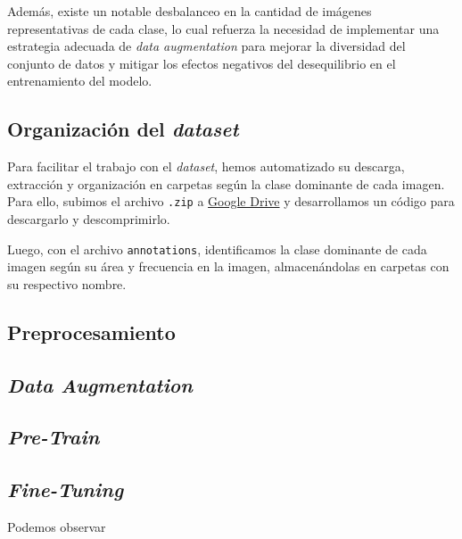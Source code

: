 \quad

\noindent
Además, existe un notable desbalanceo en la cantidad de imágenes representativas de cada clase, lo cual refuerza la necesidad de implementar una estrategia adecuada de 
\textit{data augmentation} para mejorar la diversidad del conjunto de datos y mitigar los efectos negativos del desequilibrio en el entrenamiento del modelo.

\subsection{Organización del \textit{dataset}}

\noindent
Para facilitar el trabajo con el \textit{dataset}, hemos automatizado su descarga, extracción y organización en carpetas según la clase dominante de
cada imagen. Para ello, subimos el archivo \texttt{.zip} a \href{https://drive.google.com/uc?id=1iGBv-VT5mm1RiouD-U2qWcU3BYqp2OwE}{Google Drive} y 
desarrollamos un código para descargarlo y descomprimirlo.  

\quad  

\noindent
Luego, con el archivo \texttt{annotations}, identificamos la clase dominante de cada imagen según su área y frecuencia en la imagen, almacenándolas
en carpetas con su respectivo nombre.  


\subsection{Preprocesamiento}

\noindent


\subsection{\textit{Data Augmentation}}

\subsection{\textit{Pre-Train}}

\subsection{\textit{Fine-Tuning}}

\noindent
Podemos observar 


